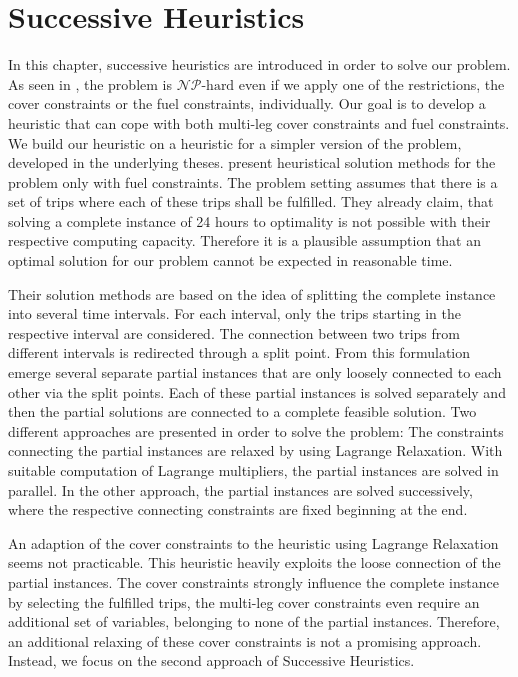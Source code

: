 \chapter{Successive Heuristics}
\label{ch:heuristics}

In this chapter, successive heuristics are introduced in order to solve our problem. As seen in , the problem is ${\mathcal{NP}\text{-hard}}$ even if we apply one of the restrictions, the cover constraints or the fuel constraints, individually. Our goal is to develop a heuristic that can cope with both multi-leg cover constraints and fuel constraints. We build our heuristic on a heuristic for a simpler version of the problem, developed in the underlying theses. \cite{Knoll} present heuristical solution methods for the problem only with fuel constraints. The problem setting assumes that there is a set of trips where each of these trips shall be fulfilled. They already claim, that solving a complete instance of 24 hours to optimality is not possible with their respective computing capacity. Therefore it is a plausible assumption that an optimal solution for our problem cannot be expected in reasonable time. 

Their solution methods are based on the idea of splitting the complete instance into several time intervals. For each interval, only the trips starting in the respective interval are considered. The connection between two trips from different intervals is redirected through a split point. From this formulation emerge several separate partial instances that are only loosely connected to each other via the split points. Each of these partial instances is solved separately and then the partial solutions are connected to a complete feasible solution. Two different approaches are presented in order to solve the problem: The constraints connecting the partial instances are relaxed by using Lagrange Relaxation. With suitable computation of Lagrange multipliers, the partial instances are solved in parallel. In the other approach, the partial instances are solved successively, where the respective connecting constraints are fixed beginning at the end.

An adaption of the cover constraints to the heuristic using Lagrange Relaxation seems not practicable. This heuristic heavily exploits the loose connection of the partial instances. The cover constraints strongly influence the complete instance by selecting the fulfilled trips, the multi-leg cover constraints even require an additional set of variables, belonging to none of the partial instances. Therefore, an additional relaxing of these cover constraints is not a promising approach. Instead, we focus on the second approach of Successive Heuristics.

